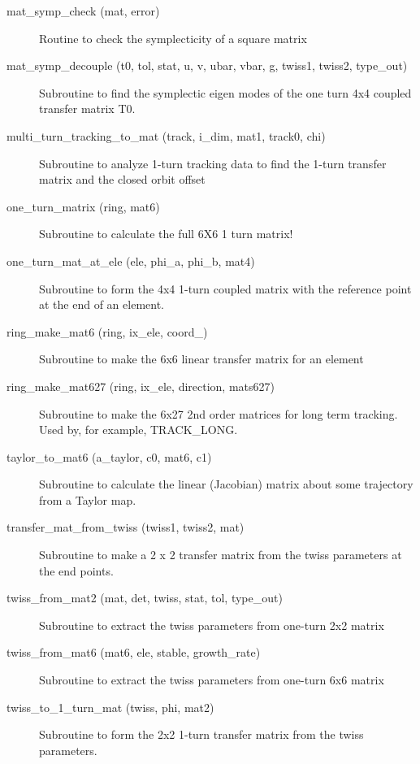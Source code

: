 \begin{description}
\item[mat\_symp\_check (mat, error)] \Newline
Routine to check the symplecticity of a square matrix 

\item[mat\_symp\_decouple (t0, tol, stat, u, v, ubar, vbar, g, twiss1, twiss2, type\_out)] \Newline
Subroutine to find the symplectic eigen modes of the one turn 4x4 coupled transfer matrix T0. 

\item[multi\_turn\_tracking\_to\_mat (track, i\_dim, mat1, track0, chi)] \Newline
Subroutine to analyze 1-turn tracking data to find the 1-turn transfer matrix and the closed orbit offset 

\item[one\_turn\_matrix (ring, mat6)] \Newline
Subroutine to calculate the full 6X6 1 turn matrix! 

\item[one\_turn\_mat\_at\_ele (ele, phi\_a, phi\_b, mat4)] \Newline
Subroutine to form the 4x4 1-turn coupled matrix with the reference point at the end of an element. 

\item[ring\_make\_mat6 (ring, ix\_ele, coord\_)] \Newline
Subroutine to make the 6x6 linear transfer matrix for an element 

\item[ring\_make\_mat627 (ring, ix\_ele, direction, mats627)] \Newline
Subroutine to make the 6x27 2nd order matrices for long term tracking. Used by, for example, TRACK\_LONG. 

\item[taylor\_to\_mat6 (a\_taylor, c0, mat6, c1)] \Newline
Subroutine to calculate the linear (Jacobian) matrix about some trajectory from a Taylor map. 

\item[transfer\_mat\_from\_twiss (twiss1, twiss2, mat)] \Newline
Subroutine to make a 2 x 2 transfer matrix from the twiss parameters at the end points. 

\item[twiss\_from\_mat2 (mat, det, twiss, stat, tol, type\_out)] \Newline
Subroutine to extract the twiss parameters from one-turn 2x2 matrix 

\item[twiss\_from\_mat6 (mat6, ele, stable, growth\_rate)] \Newline
Subroutine to extract the twiss parameters from one-turn 6x6 matrix 

\item[twiss\_to\_1\_turn\_mat (twiss, phi, mat2)] \Newline
Subroutine to form the 2x2 1-turn transfer matrix from the twiss parameters. 

\end{description}

